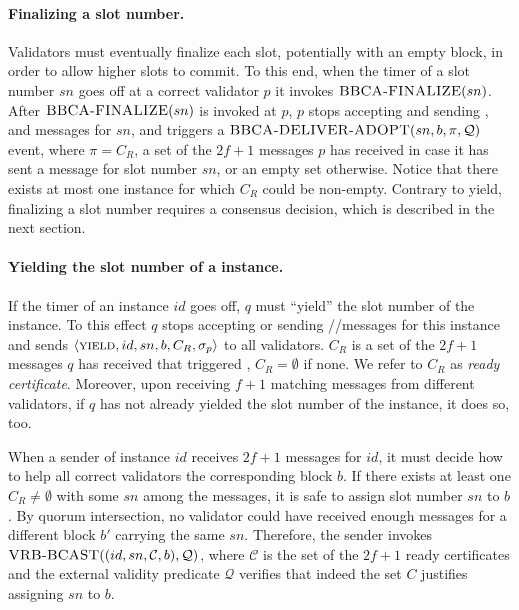 \paragraph{Finalizing a slot number.}
Validators must eventually finalize each slot, potentially with an empty block, 
in order to allow higher slots to commit. 
To this end, 
when the timer of a slot number $sn$ goes off at a correct validator $p$ it invokes $\textsc{BBCA-FINALIZE}(sn)$.
After $\textsc{BBCA-FINALIZE}(sn)$ is invoked at $p$, $p$ stops accepting and sending \initiate, \echo and \ready messages for $sn$,
and triggers a $\textsc{BBCA-DELIVER-ADOPT}(sn, b, \pi, \mathcal{Q})$ event, where $\pi=C_R$,
a set of the $2f+1$ \echo messages $p$ has received in case it has sent a \ready message for slot number $sn$,
or an empty set otherwise.
Notice that there exists at most one instance for which $C_R$ could be non-empty.
Contrary to yield, finalizing a slot number requires a consensus decision, which is described in the next section. 

\paragraph{Yielding the slot number of a \primitive instance.}
If the timer of an instance $id$ goes off, $q$ must ``yield'' the slot number of the instance.
To this effect $q$ stops accepting or sending \initiate/\echo/\ready messages for this instance and sends $\langle\textsc{yield}, id, sn, b, C_R, \sigma_p \rangle$ to all validators.
$C_R$ is a set of the $2f+1$ \echo messages $q$ has received that triggered \ready,
$C_R = \emptyset$ if none.
We refer to $C_R$ as \emph{ready certificate}.
Moreover, upon receiving $f+1$ matching \abort messages from different validators, if $q$ has not already yielded the slot number of the instance, it does so, too.

When a sender of instance $id$ receives $2f+1$ \abort messages for $id$, it must decide how to help all correct validators \bbcadeliver the corresponding block $b$.
If there exists at least one $C_R \neq \emptyset$ with some $sn$ among the \abort messages, it is safe to assign slot number $sn$ to $b$. By quorum intersection, no validator could have received enough \echo messages for a different block $b'$ carrying the same $sn$.
Therefore, the sender invokes $\textsc{VRB-BCAST}((id,sn,\mathcal{C},b),\mathcal{Q})$, where $\mathcal{C}$ is the set of the $2f+1$ ready certificates and the external validity predicate $\mathcal{Q}$ verifies that indeed the set $C$ justifies assigning $sn$ to $b$.

